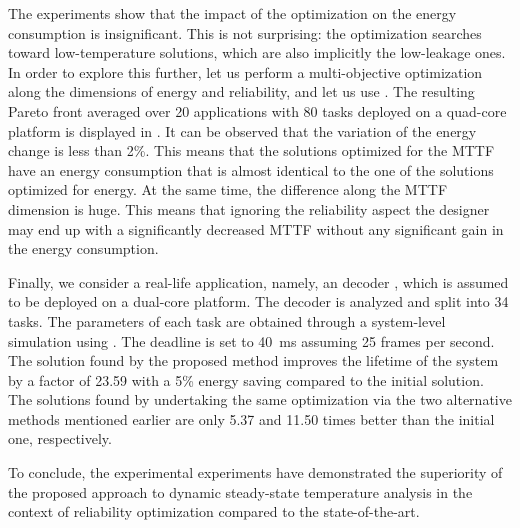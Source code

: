 The experiments show that the impact of the optimization on the energy
consumption is insignificant. This is not surprising: the optimization searches
toward low-temperature solutions, which are also implicitly the low-leakage
ones. In order to explore this further, let us perform a multi-objective
optimization along the dimensions of energy and reliability, and let us use
 \cite{deb2002}. The resulting Pareto front averaged over 20
applications with 80 tasks deployed on a quad-core platform is displayed in
. It can be observed that the variation of the
energy change is less than 2\%. This means that the solutions optimized for the
\ac{MTTF} have an energy consumption that is almost identical to the one of the
solutions optimized for energy. At the same time, the difference along the
\ac{MTTF} dimension is huge. This means that ignoring the reliability aspect the
designer may end up with a significantly decreased \ac{MTTF} without any
significant gain in the energy consumption.

Finally, we consider a real-life application, namely, an  decoder
\cite{ffmpeg2011}, which is assumed to be deployed on a dual-core platform. The
decoder is analyzed and split into 34 tasks. The parameters of each task are
obtained through a system-level simulation using  \cite{benini2005}.
The deadline is set to 40~ms assuming 25 frames per second. The solution found
by the proposed method improves the lifetime of the system by a factor of 23.59
with a 5\% energy saving compared to the initial solution. The solutions found
by undertaking the same optimization via the two alternative methods mentioned
earlier are only 5.37 and 11.50 times better than the initial one, respectively.

To conclude, the experimental experiments have demonstrated the superiority of
the proposed approach to dynamic steady-state temperature analysis in the
context of reliability optimization compared to the state-of-the-art.
